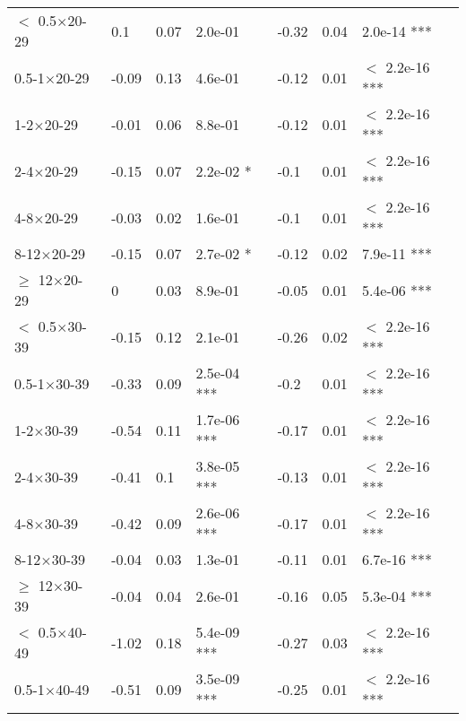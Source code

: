 \documentclass{article}\usepackage[utf8]{inputenc}
\begin{document}
\begin{longtable}[t]{lllllll}
\hspace{1em}$<$ 0.5$\times$20-29 & 0.1 & 0.07 & 2.0e-01 & -0.32 & 0.04 & 2.0e-14 ***\\
\hspace{1em}0.5-1$\times$20-29 & -0.09 & 0.13 & 4.6e-01 & -0.12 & 0.01 & $<$ 2.2e-16 ***\\
\hspace{1em}1-2$\times$20-29 & -0.01 & 0.06 & 8.8e-01 & -0.12 & 0.01 & $<$ 2.2e-16 ***\\
\hspace{1em}2-4$\times$20-29 & -0.15 & 0.07 & 2.2e-02 * & -0.1 & 0.01 & $<$ 2.2e-16 ***\\
\hspace{1em}4-8$\times$20-29 & -0.03 & 0.02 & 1.6e-01 & -0.1 & 0.01 & $<$ 2.2e-16 ***\\
\hspace{1em}8-12$\times$20-29 & -0.15 & 0.07 & 2.7e-02 * & -0.12 & 0.02 & 7.9e-11 ***\\
\hspace{1em}$\geq$ 12$\times$20-29 & 0 & 0.03 & 8.9e-01 & -0.05 & 0.01 & 5.4e-06 ***\\
\hspace{1em}$<$ 0.5$\times$30-39 & -0.15 & 0.12 & 2.1e-01 & -0.26 & 0.02 & $<$ 2.2e-16 ***\\
\hspace{1em}0.5-1$\times$30-39 & -0.33 & 0.09 & 2.5e-04 *** & -0.2 & 0.01 & $<$ 2.2e-16 ***\\
\hspace{1em}1-2$\times$30-39 & -0.54 & 0.11 & 1.7e-06 *** & -0.17 & 0.01 & $<$ 2.2e-16 ***\\
\hspace{1em}2-4$\times$30-39 & -0.41 & 0.1 & 3.8e-05 *** & -0.13 & 0.01 & $<$ 2.2e-16 ***\\
\hspace{1em}4-8$\times$30-39 & -0.42 & 0.09 & 2.6e-06 *** & -0.17 & 0.01 & $<$ 2.2e-16 ***\\
\hspace{1em}8-12$\times$30-39 & -0.04 & 0.03 & 1.3e-01 & -0.11 & 0.01 & 6.7e-16 ***\\
\hspace{1em}$\geq$ 12$\times$30-39 & -0.04 & 0.04 & 2.6e-01 & -0.16 & 0.05 & 5.3e-04 ***\\
\hspace{1em}$<$ 0.5$\times$40-49 & -1.02 & 0.18 & 5.4e-09 *** & -0.27 & 0.03 & $<$ 2.2e-16 ***\\
\hspace{1em}0.5-1$\times$40-49 & -0.51 & 0.09 & 3.5e-09 *** & -0.25 & 0.01 & $<$ 2.2e-16 ***\\

\end{longtable}
\end{document}
